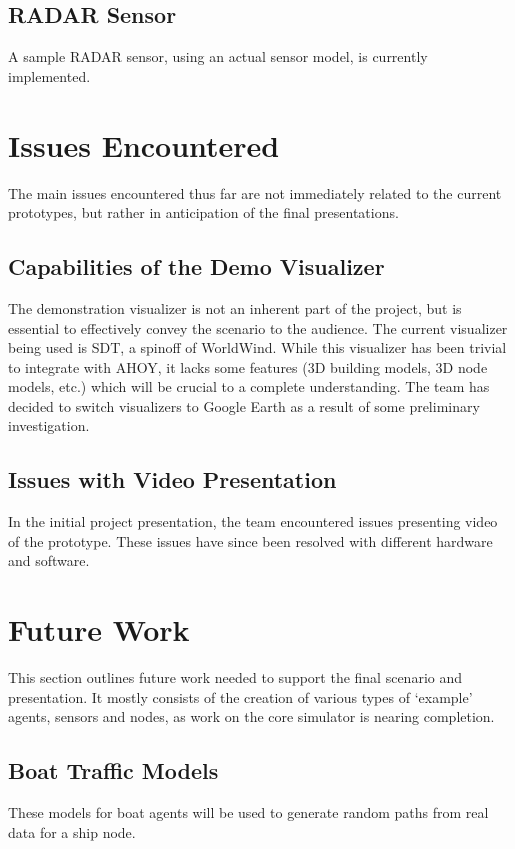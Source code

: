 \documentclass[titlepage]{article}
\begin{document}
\subsection{RADAR Sensor}
A sample RADAR sensor, using an actual sensor model, is currently implemented.

\section{Issues Encountered}
The main issues encountered thus far are not immediately related to the current prototypes, but rather in anticipation of the final presentations. 

\subsection{Capabilities of the Demo Visualizer}
The demonstration visualizer is not an inherent part of the project, but is essential to effectively convey the scenario to the audience. The current visualizer being used is SDT, a spinoff of WorldWind. While this visualizer has been trivial to integrate with AHOY, it lacks some features (3D building models, 3D node models, etc.) which will be crucial to a complete understanding. The team has decided to switch visualizers to Google Earth as a result of some preliminary investigation.

\subsection{Issues with Video Presentation}
In the initial project presentation, the team encountered issues presenting video of the prototype. These issues have since been resolved with different hardware and software.

\section{Future Work}
This section outlines future work needed to support the final scenario and presentation. It mostly consists of the creation of various types of `example' agents, sensors and nodes, as work on the core simulator is nearing completion.

\subsection{Boat Traffic Models}
These models for boat agents will be used to generate random paths from real data for a ship node.
\end{document}
